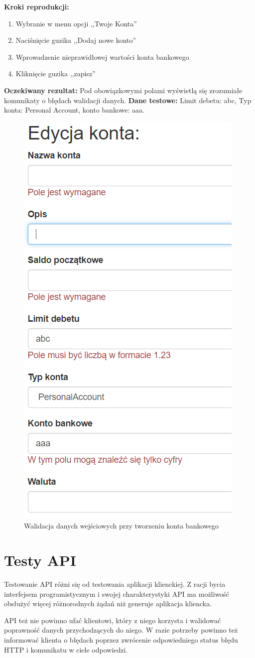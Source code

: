 \begin{enumerate}[labelwidth=1em,label=\Roman*]
    \textbf{Kroki reprodukcji:}  \begin{enumerate}[label=\arabic*.]
        \item Wybranie w menu opcji ,,Twoje Konta''
        \item Naciśnięcie guzika ,,Dodaj nowe konto''
        \item Wprowadzenie nieprawidłowej wartości konta bankowego
        \item Kliknięcie guzika ,,zapisz''
    \end{enumerate}
    \textbf{Oczekiwany rezultat:}  Pod obowiązkowymi polami wyświetlą się zrozumiałe komunikaty o błędach walidacji danych. \newline
    \textbf{Dane testowe:} Limit debetu: abc, Typ konta: Personal Account, konto bankowe: aaa. 
\end{enumerate}

\begin{figure}[t]
	\centering
	\includegraphics[width=.35\linewidth]{rys05/validation-client-1.PNG}
	\caption{Walidacja danych wejściowych przy tworzeniu konta bankowego}
	\label{fig:client-test-1}
\end{figure}

\section{Testy API}
\label{sec:test-api}

Testowanie API różni się od testowania aplikacji klienckiej. Z racji bycia interfejsem programistycznym i swojej charakterystyki API ma możliwość obsłużyć więcej różnorodnych żądań niż generuje aplikacja kliencka. 

API też nie powinno ufać klientowi, który z niego korzysta i walidować poprawność danych przychodzących do niego. W razie potrzeby powinno też informować klienta o błędach poprzez zwrócenie odpowiedniego status błędu HTTP i komunikatu w ciele odpowiedzi.

